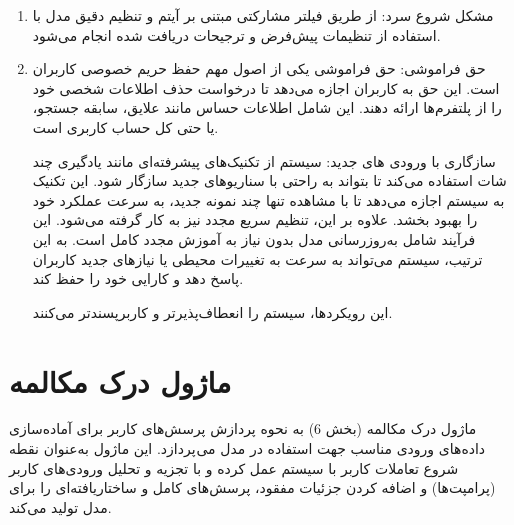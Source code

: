 \begin{enumerate}
\item
مشکل شروع سرد:
از طریق فیلتر مشارکتی مبتنی بر آیتم و تنظیم دقیق مدل با استفاده از تنظیمات پیش‌فرض و ترجیحات دریافت شده انجام می‌شود.
\item
حق فراموشی:
حق فراموشی یکی از اصول مهم حفظ حریم خصوصی کاربران است. این حق به کاربران اجازه می‌دهد تا درخواست حذف اطلاعات شخصی خود را از پلتفرم‌ها ارائه دهند. این شامل اطلاعات حساس مانند علایق، سابقه جستجو، یا حتی کل حساب کاربری است.

سازگاری با ورودی های جدید:
سیستم از تکنیک‌های پیشرفته‌ای مانند یادگیری چند شات استفاده می‌کند تا بتواند به راحتی با سناریوهای جدید سازگار شود. این تکنیک به سیستم اجازه می‌دهد تا با مشاهده تنها چند نمونه جدید، به سرعت عملکرد خود را بهبود بخشد. علاوه بر این، تنظیم سریع مجدد نیز به کار گرفته می‌شود. این فرآیند شامل به‌روزرسانی مدل بدون نیاز به آموزش مجدد کامل است. به این ترتیب، سیستم می‌تواند به سرعت به تغییرات محیطی یا نیازهای جدید کاربران پاسخ دهد و کارایی خود را حفظ کند.

این رویکردها، سیستم را انعطاف‌پذیرتر و کاربرپسندتر می‌کنند.
\end{enumerate}


\section{ماژول درک مکالمه}
ماژول درک مکالمه%
 (بخش 6) به نحوه پردازش پرسش‌های کاربر برای آماده‌سازی داده‌های ورودی مناسب جهت استفاده در مدل می پردازد. این ماژول به‌عنوان نقطه شروع تعاملات کاربر با سیستم عمل کرده و با تجزیه و تحلیل ورودی‌های کاربر (پرامپت‌ها) و اضافه کردن جزئیات مفقود، پرسش‌های کامل و ساختاریافته‌ای را برای مدل تولید می‌کند.

